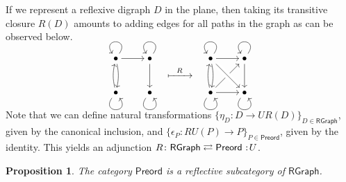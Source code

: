 \documentclass[12pt,dvipsnames,oneside]{amsart}
\theoremstyle{plain}
\newtheorem{proposition}{Proposition}[section]
\theoremstyle{remark}
\theoremstyle{definition}
\newcommand*{\from}{\colon}
\newcommand{\preord}{\mathsf{Preord}}
\newcommand{\rgraph}{\mathsf{RGraph}}
\newcommand{\forget}{U}
\newcommand*{\adj}[4]{\ensuremath{#1 \colon #3 \rightleftarrows #4 \cocolon #2}\xspace}
\newcommand*{\cocolon}{%
  \nobreak%
  \mskip6mu plus1mu
  \mathpunct{}%
  \nonscript%
  \mkern-\thinmuskip%
  {:}%
  \mskip2mu
  \relax
}
\begin{document}
\begin{example}
  If we represent a reflexive digraph \(D\) in the plane, then taking its transitive closure \(R(D)\) amounts to adding edges for all paths in the graph as can be observed below.
  \medskip

  \begin{equation*}
    \begin{gathered}
      \begin{tikzcd}[ampersand replacement=\&,cramped,row sep=25pt,column sep=normal,every matrix/.append style={inner sep=0pt}]
{\bullet} \arrow[r]\arrow[loop, in=125, out=55, distance=7mm,overlay]\arrow[d, bend left=12]\& {\bullet} \arrow[loop, in=125, out=55, distance=7mm,overlay]\arrow[d]\\
        {\bullet} \arrow[u, bend left=12]\arrow[loop, in=305, out=235, distance=7mm,overlay]\& {\bullet} \arrow[loop, in=305, out=235, distance=7mm,overlay]
\end{tikzcd}
    \end{gathered}
    \quad \xmapsto{\;\;\;R\;\;\;} \quad
    \begin{gathered}
      \begin{tikzcd}[ampersand replacement=\&,cramped,row sep=25pt,column sep=normal,every matrix/.append style={inner sep=0pt}]
{\bullet} \arrow[r]\arrow[loop, in=125, out=55, distance=7mm,overlay]\arrow[d, bend left=12]\& {\bullet} \arrow[loop, in=125, out=55, distance=7mm,overlay]\arrow[d]\\
        {\bullet} \arrow[u, bend left=12]\arrow[r]\arrow[ur]\arrow[loop, in=305, out=235, distance=7mm,overlay]\& {\bullet} \arrow[loop, in=305, out=235, distance=7mm,overlay]\arrow[from=1-1, to=2-2, crossing over]
\end{tikzcd}
    \end{gathered}
  \end{equation*}
\end{example}

Note that we can define natural transformations \(\{\eta_{D}\from D \to \forget R(D)\}_{D \in \rgraph}\), given by the canonical inclusion, and \(\{\epsilon_{P} \from R\forget(P) \to P\}_{P\in \preord}\), given by the identity.
This yields an adjunction \(\adj{R}{\forget}{\rgraph}{\preord}\).

\begin{proposition}\label{prop:preord-refl-rgraph}
  The category \(\preord\) is a reflective subcategory of \(\rgraph\).
\end{proposition}
\end{document}
